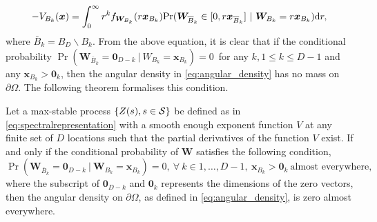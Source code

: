 \documentclass[lineno]{biometrika}
\begin{document}
\begin{equation}\label{eq:partialV_2}
 -V_{B_k}(\bm x) = \int_0^\infty r^k f_{\bm W_{B_k}}(r \bm x_{B_k})  {\rm Pr}(\bm W_{{\overline{B}}_k} \in [0,r \bm x_{{\overline{B}}_k} ]\ |\ \bm W_{B_k} = r \bm x_{B_k} )\text dr,
\end{equation}
where $\bar{B}_k = B_D \backslash B_k$.
From the above equation, it is clear that if the conditional probability $\Pr(\bm W_{\bar{B}_k} =\bm 0_{D-k}\ |\ W_{B_k} = \bm x_{B_k} )=0$\ for any $k, 1 \leq k \leq D-1$ and any $\bm x_{B_k} > \bm 0_k$, then the angular density in \eqref{eq:angular_density} has no mass on $\partial\Omega$. The following theorem formalises this condition. 
\begin{theorem}\label{thm:augular_density}
Let a max-stable process $\{Z(s), s\in {\mathcal{S}}\}$ be defined as in \eqref{eq:spectralrepresentation} with a smooth enough exponent function $V$ at any finite set of $D$ locations such that the partial derivatives of the function $V$ exist. If and only if the conditional probability of $\bm W$ satisfies the following condition, 
\begin{equation}\label{eq:thm_angular_density}
\Pr(\bm W_{\bar{B}_k}=\bm 0_{D-k} \ |\ \bm W_{B_k} = \bm x_{B_k} )=0,\ \forall\ k \in {1,\ldots,D-1},\ \bm x_{B_k}>\bm 0_k \ \text{almost everywhere, }
\end{equation}
where the subscript of $\bm 0_{D-k}$ and $\bm 0_{k}$ represents the dimensions of the zero vectors,
then the angular density on $\partial\Omega$, as defined in \eqref{eq:angular_density}, is zero almost everywhere.  
\end{theorem}
\end{document}

